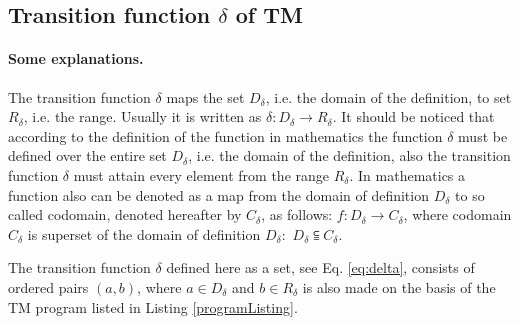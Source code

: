 \documentclass[12pt, a4paper]{report}
\begin{document}
	
	\subsection{Transition function $ \delta $ of TM}
	\paragraph{Some explanations.} The transition function $ \delta $ maps the set $ D_{\delta} $, i.e. the domain of the definition, to set $ R_{\delta} $, i.e. the range. Usually it is written as $ \delta: D_{\delta} \to R_{\delta} $.  It should be noticed that according to the definition of the function in mathematics the function $ \delta $ must be defined over the entire set $ D_{\delta} $, i.e. the domain of the definition, also the transition function $ \delta $ must attain every element from the range $ R_{\delta} $. In mathematics a function also can be denoted as a map from the domain of definition $ D_{\delta} $ to so called codomain, denoted hereafter by $ C_{\delta} $, as follows: $ f: D_{\delta} \to C_{\delta} $, where codomain $ C_{\delta} $ is superset of the domain of definition $ D_{\delta}: $ $ D_{\delta} \subseteqq C_{\delta} $.
	
	The transition function $ \delta $ defined here as a set, see Eq. \ref{eq:delta}, consists of ordered pairs $ (a , b) $, where $ a \in D_{\delta} $ and $ b \in R_{\delta}  $ is also made on the basis of the TM program listed in Listing \ref{programListing}.
	
\end{document}
